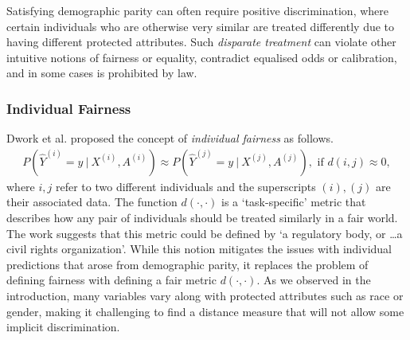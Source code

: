 \documentclass{article}
\begin{document}
Satisfying demographic parity can often
require positive discrimination, where certain individuals who
are otherwise very similar are treated differently due to having different
protected attributes. Such \emph{disparate treatment} can violate other intuitive notions of fairness or equality, contradict equalised odds or calibration, and in some cases is prohibited by law.


\subsubsection{Individual Fairness}
Dwork et al. \cite{dwork2012fairness} proposed the concept of \emph{individual fairness} as follows.
\begin{align}
P(\hat Y^{(i)} = y\ |\ X^{(i)}, A^{(i)}) \approx
   P(\hat Y^{(j)} = y\ |\ X^{(j)}, A^{(j)}), \mbox{ if } d(i, j) \approx 0, \label{eq:if}
\end{align}
where $i,j$ refer to two different individuals and the superscripts $(i),(j)$
are their associated data. The function $d(\cdot, \cdot)$ is a `task-specific'
metric that describes how any pair of individuals should be treated similarly in
a fair world. The work suggests that this metric could be defined by `a
regulatory body, or \ldots a civil rights organization'. While this notion
mitigates the issues with individual predictions that arose from demographic
parity, it replaces the problem of defining fairness with defining a fair metric
$d(\cdot, \cdot)$. As we observed in the introduction, many variables vary along with
protected attributes such as race or gender, making it challenging to
find a distance measure that will not allow some implicit discrimination.
\end{document}
